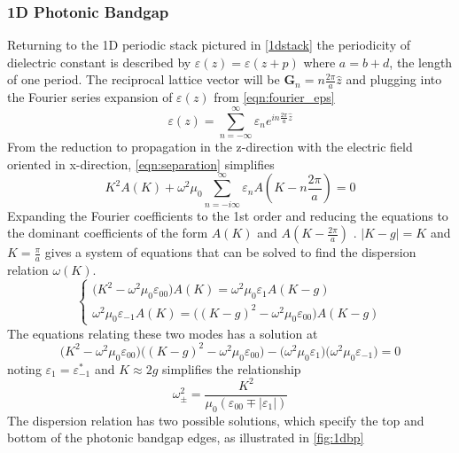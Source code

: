 \subsubsection{1D Photonic Bandgap}
Returning to the 1D periodic stack pictured in \ref{1dstack} the periodicity of dielectric constant is described by $\varepsilon(z) = \varepsilon(z+p)$ where $a = b+d$, the length of one period. The reciprocal lattice vector will be $\boldsymbol{G}_n = n\frac{2\pi}{a}\hat{z}$ and plugging into the Fourier series expansion of $\varepsilon(z)$  from \eqref{eqn:fourier_eps} 
\begin{equation}
	\varepsilon(z)  =\sum_{n=-\infty}^\infty\varepsilon_ne^{in\frac{2\pi}{a}\hat{z}}  
\end{equation}
From the reduction to propagation in the z-direction with the electric field oriented in x-direction, \eqref{eqn:separation} simplifies
\begin{equation}
K^2A(K) + \omega^2\mu_0\sum_{n=-i\infty}^\infty\varepsilon_nA(K-n\frac{2\pi}{a}) = 0
\end{equation}
Expanding the Fourier coefficients to the 1st order and reducing the equations to the dominant coefficients of the form $A(K)$ and $A(K-\frac{2\pi}{a})$ . $|K - g| = K$ and $K = \frac{\pi}{a}$ gives a system of equations that can be solved to find the dispersion relation $\omega(K)$.
\begin{equation}
	\begin{cases}
		\big(K^2-\omega^2\mu_0\varepsilon_{00}\big)A(K) = \omega^2\mu_0\varepsilon_1A(K - g)\\
		\omega^2\mu_0\varepsilon_{-1}A(K) = \big((K-g)^2-\omega^2\mu_0\varepsilon_{00}\big)A(K-g) 
	\end{cases}
\end{equation}
The equations relating these two modes has a solution at
\begin{equation}
		\big(K^2-\omega^2\mu_0\varepsilon_{00}\big)\big((K-g)^2-\omega^2\mu_0\varepsilon_{00}\big) -\big(\omega^2\mu_0\varepsilon_1\big)\big(\omega^2\mu_0\varepsilon_{-1}\big)  = 0 
\end{equation}
 noting $\varepsilon_1 = \varepsilon_{-1}^*$ and $K\approx2g$ simplifies the relationship 
\begin{equation}
	\omega_{\pm}^2 = \frac{K^2}{\mu_0(\varepsilon_{00}\mp|\varepsilon_1|)}
\end{equation}
The dispersion relation has two possible solutions, which specify the top and bottom of the photonic bandgap edges, as illustrated in \ref{fig:1dbp}
